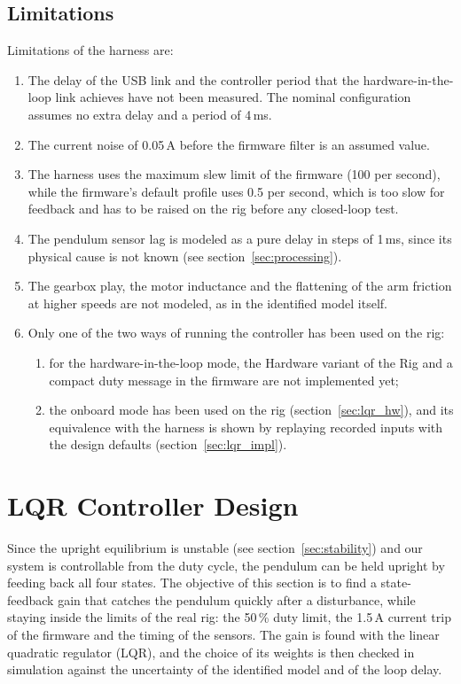\documentclass[a4paper,11pt]{article}
\begin{document}
\subsection{Limitations}
Limitations of the harness are:
\begin{enumerate}
  \item The delay of the USB link and the controller period that the hardware-in-the-loop link achieves have not been measured. The nominal configuration assumes no extra delay and a period of 4\,ms.
  \item The current noise of 0.05\,A before the firmware filter is an assumed value.
  \item The harness uses the maximum slew limit of the firmware (100 per second), while the firmware's default profile uses 0.5 per second, which is too slow for feedback and has to be raised on the rig before any closed-loop test.
  \item The pendulum sensor lag is modeled as a pure delay in steps of 1\,ms, since its physical cause is not known (see section~\ref{sec:processing}).
  \item The gearbox play, the motor inductance and the flattening of the arm friction at higher speeds are not modeled, as in the identified model itself.
  \item Only one of the two ways of running the controller has been used on the rig:
  \begin{enumerate}
    \item for the hardware-in-the-loop mode, the Hardware variant of the Rig and a compact duty message in the firmware are not implemented yet;
    \item the onboard mode has been used on the rig (section~\ref{sec:lqr_hw}), and its equivalence with the harness is shown by replaying recorded inputs with the design defaults (section~\ref{sec:lqr_impl}).
  \end{enumerate}
\end{enumerate}

\section{LQR Controller Design}
\label{sec:lqr}
Since the upright equilibrium is unstable (see section~\ref{sec:stability}) and our system is controllable from the duty cycle, the pendulum can be held upright by feeding back all four states. The objective of this section is to find a state-feedback gain that catches the pendulum quickly after a disturbance, while staying inside the limits of the real rig: the 50\,\% duty limit, the 1.5\,A current trip of the firmware and the timing of the sensors. The gain is found with the linear quadratic regulator (LQR), and the choice of its weights is then checked in simulation against the uncertainty of the identified model and of the loop delay.
\end{document}

